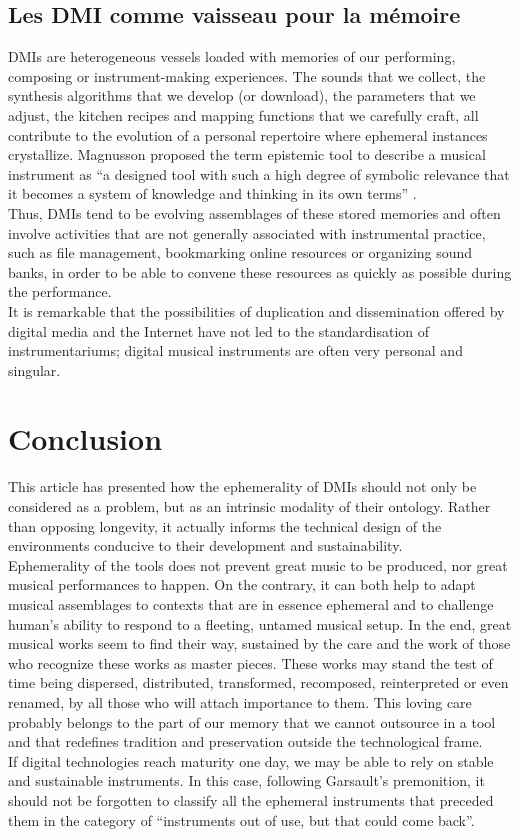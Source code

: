 \subsection{Les DMI comme vaisseau pour la mémoire}
DMIs are heterogeneous vessels loaded with memories of our performing, composing or instrument-making experiences. The sounds that we collect, the synthesis algorithms that we develop (or download), the parameters that we adjust, the kitchen recipes and mapping functions that we carefully craft, all contribute to the evolution of a personal repertoire where ephemeral instances crystallize. Magnusson proposed the term epistemic tool to describe a musical instrument as “a designed tool with such a high degree of symbolic relevance that it becomes a system of knowledge and thinking in its own terms” \cite{magnusson_epistemic_2009}.\\
\indent Thus, DMIs tend to be evolving assemblages of these stored memories and often involve activities that are not generally associated with instrumental practice, such as file management, bookmarking online resources or organizing sound banks, in order to be able to convene these resources as quickly as possible during the performance.\\
\indent It is remarkable that the possibilities of duplication and dissemination offered by digital media and the Internet have not led to the standardisation of instrumentariums; digital musical instruments are often very personal and singular.

\section{Conclusion}
This article has presented how the ephemerality of DMIs should not only be considered as a problem, but as an intrinsic modality of their ontology. Rather than opposing longevity, it actually informs the technical design of the environments conducive to their development and sustainability.\\
\indent Ephemerality of the tools does not prevent great music to be produced, nor great musical performances to happen. On the contrary, it can both help to adapt musical assemblages to contexts that are in essence ephemeral and to challenge human's ability to respond to a fleeting, untamed musical setup. In the end, great musical works seem to find their way, sustained by the care and the work of those who recognize these works as master pieces. These works may stand the test of time being dispersed, distributed, transformed, recomposed, reinterpreted or even renamed, by all those who will attach importance to them. This loving care probably belongs to the part of our memory that we cannot outsource in a tool and that redefines tradition and preservation outside the technological frame.\\
\indent If digital technologies reach maturity one day, we may be able to rely on stable and sustainable instruments. In this case, following Garsault's premonition, it should not be forgotten to classify all the ephemeral instruments that preceded them in the category of “instruments out of use, but that could come back”.


